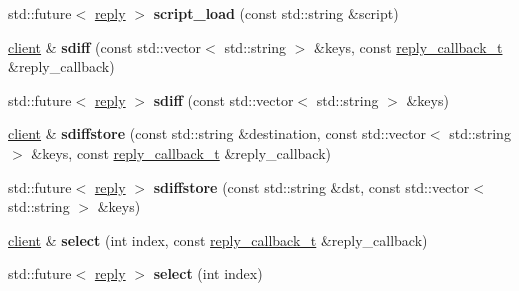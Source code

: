 \begin{DoxyCompactItemize}
\item 
\mbox{\label{classcpp__redis_1_1client_a2c42d83c0bfcb46d41d2c205d808e6c8}} 
std\+::future$<$ \hyperlink{classcpp__redis_1_1reply}{reply} $>$ {\bfseries script\+\_\+load} (const std\+::string \&script)
\item 
\mbox{\label{classcpp__redis_1_1client_a9d70980e8fc5c90f218c5fd2215bed89}} 
\hyperlink{classcpp__redis_1_1client}{client} \& {\bfseries sdiff} (const std\+::vector$<$ std\+::string $>$ \&keys, const \hyperlink{classcpp__redis_1_1client_a061a1140d36d2eaeda82b09a0bb3f9f2}{reply\+\_\+callback\+\_\+t} \&reply\+\_\+callback)
\item 
\mbox{\label{classcpp__redis_1_1client_a93ff7c295d6147d3d452364533a19de9}} 
std\+::future$<$ \hyperlink{classcpp__redis_1_1reply}{reply} $>$ {\bfseries sdiff} (const std\+::vector$<$ std\+::string $>$ \&keys)
\item 
\mbox{\label{classcpp__redis_1_1client_a0f896b36f3284d66bb1679f535378bf5}} 
\hyperlink{classcpp__redis_1_1client}{client} \& {\bfseries sdiffstore} (const std\+::string \&destination, const std\+::vector$<$ std\+::string $>$ \&keys, const \hyperlink{classcpp__redis_1_1client_a061a1140d36d2eaeda82b09a0bb3f9f2}{reply\+\_\+callback\+\_\+t} \&reply\+\_\+callback)
\item 
\mbox{\label{classcpp__redis_1_1client_afd4930fd767bbf14bae1f5ddfd8ee212}} 
std\+::future$<$ \hyperlink{classcpp__redis_1_1reply}{reply} $>$ {\bfseries sdiffstore} (const std\+::string \&dst, const std\+::vector$<$ std\+::string $>$ \&keys)
\item 
\mbox{\label{classcpp__redis_1_1client_aee37b9bd265b8db614b4d7dcfdbaa422}} 
\hyperlink{classcpp__redis_1_1client}{client} \& {\bfseries select} (int index, const \hyperlink{classcpp__redis_1_1client_a061a1140d36d2eaeda82b09a0bb3f9f2}{reply\+\_\+callback\+\_\+t} \&reply\+\_\+callback)
\item 
\mbox{\label{classcpp__redis_1_1client_a5eae97b05129d0571c3b871e1a786434}} 
std\+::future$<$ \hyperlink{classcpp__redis_1_1reply}{reply} $>$ {\bfseries select} (int index)

\end{DoxyCompactItemize}
